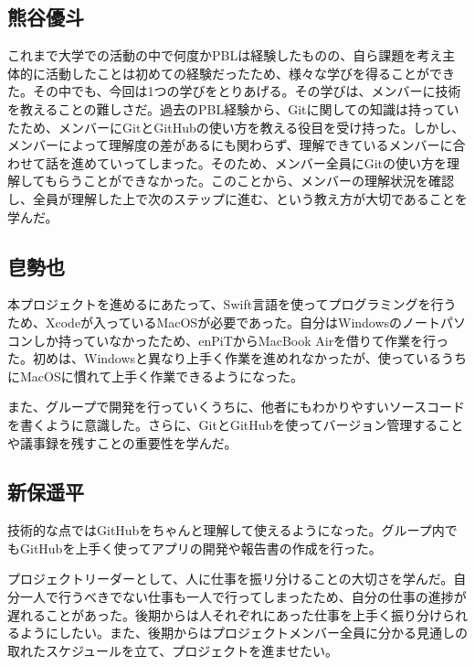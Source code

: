 \documentclass[openany,11pt,papersize]{jsbook}
\begin{document}
\subsection{熊谷優斗}
\par これまで大学での活動の中で何度かPBLは経験したものの、自ら課題を考え主体的に活動したことは初めての経験だったため、様々な学びを得ることができた。その中でも、今回は1つの学びをとりあげる。その学びは、メンバーに技術を教えることの難しさだ。過去のPBL経験から、Gitに関しての知識は持っていたため、メンバーにGitとGitHubの使い方を教える役目を受け持った。しかし、メンバーによって理解度の差があるにも関わらず、理解できているメンバーに合わせて話を進めていってしまった。そのため、メンバー全員にGitの使い方を理解してもらうことができなかった。このことから、メンバーの理解状況を確認し、全員が理解した上で次のステップに進む、という教え方が大切であることを学んだ。

\subsection{皀勢也}
本プロジェクトを進めるにあたって、Swift言語を使ってプログラミングを行うため、Xcodeが入っているMacOSが必要であった。自分はWindowsのノートパソコンしか持っていなかったため、enPiTからMacBook Airを借りて作業を行った。初めは、Windowsと異なり上手く作業を進めれなかったが、使っているうちにMacOSに慣れて上手く作業できるようになった。
\par
また、グループで開発を行っていくうちに、他者にもわかりやすいソースコードを書くように意識した。さらに、GitとGitHubを使ってバージョン管理することや議事録を残すことの重要性を学んだ。


\subsection{新保遥平}
\par 技術的な点ではGitHubをちゃんと理解して使えるようになった。グループ内でもGitHubを上手く使ってアプリの開発や報告書の作成を行った。
\par プロジェクトリーダーとして、人に仕事を振リ分けることの大切さを学んだ。自分一人で行うべきでない仕事も一人で行ってしまったため、自分の仕事の進捗が遅れることがあった。後期からは人それぞれにあった仕事を上手く振り分けられるようにしたい。また、後期からはプロジェクトメンバー全員に分かる見通しの取れたスケジュールを立て、プロジェクトを進ませたい。

\end{document}

